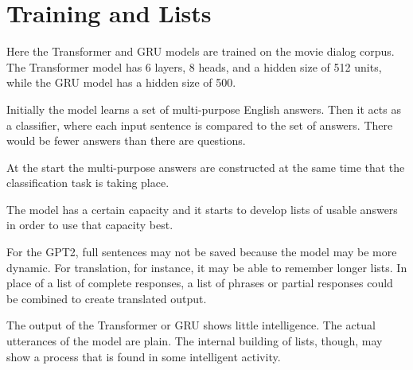 \section{Training and Lists}

Here the Transformer and GRU models are trained on the movie dialog corpus. The Transformer model has 6 layers, 8 heads, and a hidden size of 512 units, while the GRU model has a hidden size of 500.

Initially the model learns a set of multi-purpose English answers. Then it acts as a classifier, where each input sentence is compared to the set of answers. There would be fewer answers than there are questions. 

At the start the multi-purpose answers are constructed at the same time that the classification task is taking place. 


The model has a certain capacity and it starts to develop lists of usable answers in order to use that capacity best.

For the GPT2, full sentences may not be saved because the model may be more dynamic. For translation, for instance, it may be able to remember longer lists. In place of a list of complete responses, a list of phrases or partial responses could be combined to create translated output.

The output of the Transformer or GRU shows little intelligence. The actual utterances of the model are plain. The internal building of lists, though, may show a process that is found in some intelligent activity.